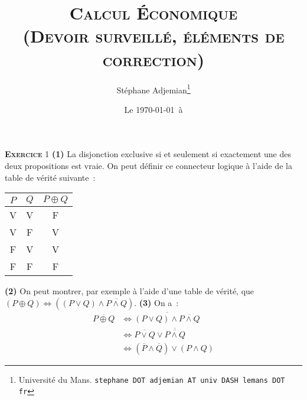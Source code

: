 \documentclass[10pt,a4paper,notitlepage]{article}
\newcommand{\exercice}[1]{\textsc{\textbf{Exercice}} #1}
\providecommand{\lxor}{\oplus}
\begin{document}
\title{\textsc{Calcul Économique\\ \small{(Devoir surveillé, éléments de correction)}}}
\author{Stéphane Adjemian\thanks{Université du Mans. \texttt{stephane DOT adjemian AT univ DASH lemans DOT fr}}}
\date{Le \today\ à \thistime}

\maketitle

\exercice{1} \textbf{(1)} La disjonction exclusive si et seulement si exactement une des deux propositions
est vraie. On peut définir ce connecteur logique à l'aide de la table
de vérité suivante :

\begin{table}[H]
  \centering
  \begin{tabular}[H]{ccc}
    \hline
    $P$ & $Q$ & $P \lxor Q$ \\ \hline
    V & V & F \\
    V & F & V \\
    F & V & V \\
    F & F & F \\ \hline\hline
  \end{tabular}
\end{table}

\textbf{(2)} On peut montrer, par exemple à l'aide d'une table de vérité, que $(P \lxor Q) \Leftrightarrow ((P \lor Q) \land \overline{P\land Q})$. \textbf{(3)} On a :
\[
  \begin{split}
    \overline{P \lxor Q} &\Leftrightarrow \overline{(P \lor Q) \land \overline{P\land Q}}\\
    &\Leftrightarrow \overline{P \lor Q} \lor \overline{\overline{P\land Q}}\\
    &\Leftrightarrow (\overline{P} \land \overline{Q}) \lor (P\land Q) 
  \end{split}
\]

\bigskip
\end{document}
